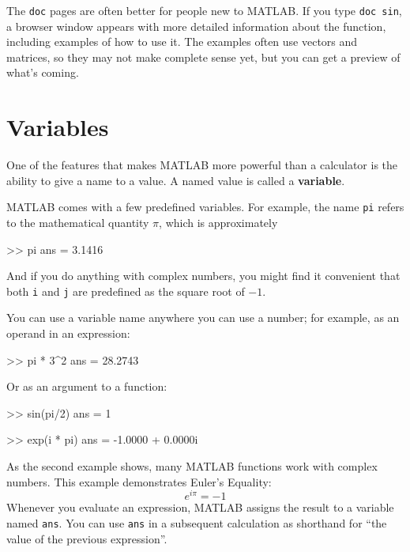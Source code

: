 \documentclass[main.tex]{subfiles}
\begin{document}

The {\tt doc} pages are often better for people new to MATLAB.  
If you type {\tt doc sin}, a browser window appears with more detailed information about the function, including examples of how to use it.  The examples often
use vectors and matrices, so they may not make complete sense yet, 
but you can get a preview of what's coming.


\section{Variables}

One of the features that makes MATLAB more powerful than a calculator
is the ability to give a name to a value.  A named value is called
a {\bf variable}.

 
MATLAB comes with a few predefined variables. For
example, the name {\tt pi} refers to the
mathematical quantity $\pi$, which is approximately

\begin{code}
>> pi
ans = 3.1416
\end{code}

And if you do anything with complex numbers, you might find it
convenient that both {\tt i} and {\tt j} are predefined as the square
root of $-1$.


You can use a variable name anywhere you can use a number; for example, as
an operand in an expression:

\begin{code}
>> pi * 3^2
ans = 28.2743
\end{code}

Or as an argument to a function:

\begin{code}
>> sin(pi/2)
ans = 1

>> exp(i * pi)
ans = -1.0000 + 0.0000i
\end{code}


As the second example shows, many MATLAB functions work with
complex numbers.  This example demonstrates Euler's Equality:
%
\begin{equation*}
e^{i \pi} = -1
\end{equation*}
%
Whenever you evaluate an expression, MATLAB assigns the result to
a variable named {\tt ans}.  You can use {\tt ans} in a subsequent
calculation as shorthand for ``the value of the previous expression''.
\end{document}
